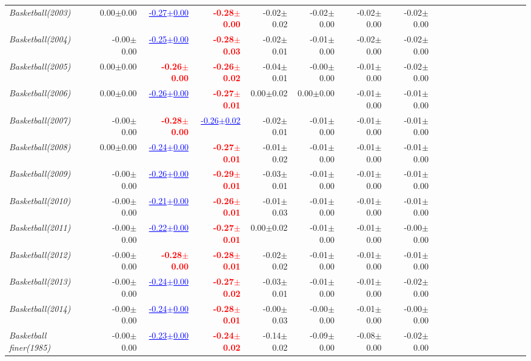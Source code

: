 \documentclass[nohyperref]{article}
\theoremstyle{plain}
\theoremstyle{definition}
\theoremstyle{remark}
\newcommand{\red}[1]{\textcolor{red}{\textbf{#1}}}
\newcommand{\blue}[1]{\textcolor{blue}{\underline{#1}}}
\begin{document}
\begin{table*}[!ht]
{\begin{tabular}{lrrrrrrrrrrrrrrrrrr}
			{\it Basketball(2003)} & 0.00$\pm$0.00 & \blue{-0.27$\pm$0.00} & \red{-0.28$\pm$0.00} & -0.02$\pm$0.02 & -0.02$\pm$0.00 & -0.02$\pm$0.00 & -0.02$\pm$0.00 \\
			{\it Basketball(2004)} & -0.00$\pm$0.00 & \blue{-0.25$\pm$0.00} & \red{-0.28$\pm$0.03} & -0.02$\pm$0.01 & -0.01$\pm$0.00 & -0.02$\pm$0.00 & -0.02$\pm$0.00 \\
			{\it Basketball(2005)} & 0.00$\pm$0.00 & \red{-0.26$\pm$0.00} & \red{-0.26$\pm$0.02} & -0.04$\pm$0.01 & -0.00$\pm$0.00 & -0.01$\pm$0.00 & -0.02$\pm$0.00 \\
			{\it Basketball(2006)} & 0.00$\pm$0.00 & \blue{-0.26$\pm$0.00} & \red{-0.27$\pm$0.01} & 0.00$\pm$0.02 & 0.00$\pm$0.00 & -0.01$\pm$0.00 & -0.01$\pm$0.00 \\
			{\it Basketball(2007)} & -0.00$\pm$0.00 & \red{-0.28$\pm$0.00} & \blue{-0.26$\pm$0.02} & -0.02$\pm$0.01 & -0.01$\pm$0.00 & -0.01$\pm$0.00 & -0.01$\pm$0.00 \\
			{\it Basketball(2008)} & 0.00$\pm$0.00 & \blue{-0.24$\pm$0.00} & \red{-0.27$\pm$0.01} & -0.01$\pm$0.02 & -0.01$\pm$0.00 & -0.01$\pm$0.00 & -0.01$\pm$0.00 \\
			{\it Basketball(2009)} & -0.00$\pm$0.00 & \blue{-0.26$\pm$0.00} & \red{-0.29$\pm$0.01} & -0.03$\pm$0.01 & -0.01$\pm$0.00 & -0.01$\pm$0.00 & -0.01$\pm$0.00 \\
			{\it Basketball(2010)} & -0.00$\pm$0.00 & \blue{-0.21$\pm$0.00} & \red{-0.26$\pm$0.01} & -0.01$\pm$0.03 & -0.01$\pm$0.00 & -0.01$\pm$0.00 & -0.01$\pm$0.00 \\
			{\it Basketball(2011)} & -0.00$\pm$0.00 & \blue{-0.22$\pm$0.00} & \red{-0.27$\pm$0.01} & 0.00$\pm$0.02 & -0.01$\pm$0.00 & -0.01$\pm$0.00 & -0.00$\pm$0.00 \\
			{\it Basketball(2012)} & -0.00$\pm$0.00 & \red{-0.28$\pm$0.00} & \red{-0.28$\pm$0.01} & -0.02$\pm$0.02 & -0.01$\pm$0.00 & -0.01$\pm$0.00 & -0.01$\pm$0.00 \\
			{\it Basketball(2013)} & -0.00$\pm$0.00 & \blue{-0.24$\pm$0.00} & \red{-0.27$\pm$0.02} & -0.03$\pm$0.01 & -0.01$\pm$0.00 & -0.01$\pm$0.00 & -0.02$\pm$0.00 \\
			{\it Basketball(2014)} & -0.00$\pm$0.00 & \blue{-0.24$\pm$0.00} & \red{-0.28$\pm$0.01} & -0.00$\pm$0.03 & -0.00$\pm$0.00 & -0.01$\pm$0.00 & -0.00$\pm$0.00 \\
			{\it Basketball finer(1985)} & -0.00$\pm$0.00 & \blue{-0.23$\pm$0.00} & \red{-0.24$\pm$0.02} & -0.14$\pm$0.02 & -0.09$\pm$0.00 & -0.08$\pm$0.00 & -0.02$\pm$0.00 \\

\end{tabular}}
\end{table*}
\end{document}
